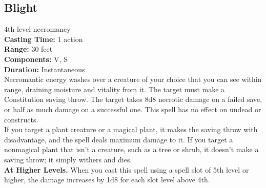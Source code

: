 \documentclass[11pt, A4paper, english]{article}
\begin{document}
		\subsection{Blight}
4th-level necromancy \\
\textbf{Casting Time:} 1 action \\
\textbf{Range:} 30 feet \\
\textbf{Components:} V, S \\
\textbf{Duration:} Instantaneous \\
Necromantic energy washes over a creature of your choice that you can see within range, draining moisture and vitality from it. The target must make a Constitution saving throw. The target takes 8d8 necrotic damage on a failed save, or half as much damage on a successful one. This spell has no effect on undead or constructs. \\
If you target a plant creature or a magical plant, it makes the saving throw with disadvantage, and the spell deals maximum damage to it. If you target a nonmagical plant that isn’t a creature, such as a tree or shrub, it doesn’t make a saving throw; it simply withers and dies. \\
\textbf{At Higher Levels.} When you cast this spell using a spell slot of 5th level or higher, the damage increases by 1d8 for each slot level above 4th.
\end{document}
